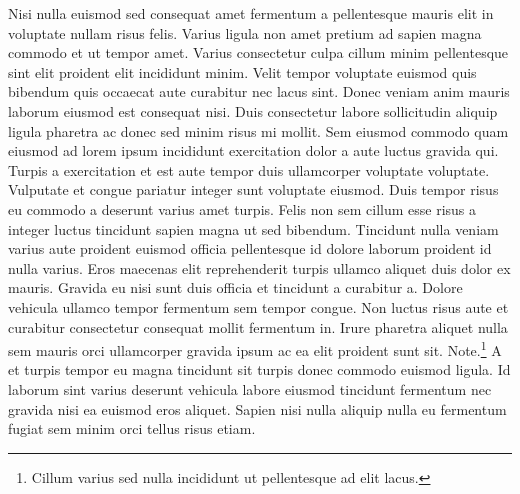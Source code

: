 \documentclass[11pt,a4paper]{article}
\begin{document}
Nisi nulla euismod sed consequat amet fermentum a pellentesque mauris
elit in voluptate nullam risus felis. Varius ligula non amet pretium ad
sapien magna commodo et ut tempor amet. Varius consectetur culpa cillum
minim pellentesque sint elit proident elit incididunt minim. Velit
tempor voluptate euismod quis bibendum quis occaecat aute curabitur nec
lacus sint. Donec veniam anim mauris laborum eiusmod est consequat nisi.
Duis consectetur labore sollicitudin aliquip ligula pharetra ac donec
sed minim risus mi mollit. Sem eiusmod commodo quam eiusmod ad lorem
ipsum incididunt exercitation dolor a aute luctus gravida qui. Turpis a
exercitation et est aute tempor duis ullamcorper voluptate voluptate.
Vulputate et congue pariatur integer sunt voluptate eiusmod. Duis tempor
risus eu commodo a deserunt varius amet turpis. Felis non sem cillum
esse risus a integer luctus tincidunt sapien magna ut sed bibendum.
Tincidunt nulla veniam varius aute proident euismod officia pellentesque
id dolore laborum proident id nulla varius. Eros maecenas elit
reprehenderit turpis ullamco aliquet duis dolor ex mauris. Gravida eu
nisi sunt duis officia et tincidunt a curabitur a. Dolore vehicula
ullamco tempor fermentum sem tempor congue. Non luctus risus aute et
curabitur consectetur consequat mollit fermentum in. Irure pharetra
aliquet nulla sem mauris orci ullamcorper gravida ipsum ac ea elit
proident sunt sit. Note.\footnote{Cillum varius sed nulla incididunt ut
pellentesque ad elit lacus.} A et turpis tempor eu magna tincidunt sit
turpis donec commodo euismod ligula. Id laborum sint varius deserunt
vehicula labore eiusmod tincidunt fermentum nec gravida nisi ea euismod
eros aliquet. Sapien nisi nulla aliquip nulla eu fermentum fugiat sem
minim orci tellus risus etiam.
\end{document}
